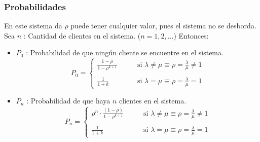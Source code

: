 \documentclass{templateNote}
\begin{document}
\subsubsection{Probabilidades}
En este sistema da $\rho$ puede tener cualquier valor, pues el sistema no se desborda. \newline
Sea $n$ : Cantidad de clientes en el sistema. ($n=1,2,...$)
Entonces:
\begin{itemize}
    \item $P_0$ : Probabilidad de que ning\'un cliente se encuentre en el sistema.
    \begin{equation*}
        P_0 = \begin{cases}
            \displaystyle \frac{1 - \rho}{1 - \rho^{k + 1}} & \qquad \text{si } \lambda \neq \mu \equiv \rho = \frac{\lambda}{\mu} \neq 1 \\
            \\
            \displaystyle \frac{1}{1 + k} & \qquad \text{si } \lambda = \mu \equiv \rho = \frac{\lambda}{\mu} = 1
        \end{cases}
    \end{equation*}
    
    \item $P_n$ : Probabilidad de que haya $n$ clientes en el sistema.
    \begin{equation*}
        P_n = \begin{cases}
            \displaystyle \rho^n \cdot \frac{(1 - \rho)}{1 - \rho^{k + 1}} & \qquad \text{si } \lambda \neq \mu \equiv \rho = \frac{\lambda}{\mu} \neq 1 \\
            \\
            \displaystyle \frac{1}{1 + k} & \qquad \text{si } \lambda = \mu \equiv \rho = \frac{\lambda}{\mu} = 1
        \end{cases}
    \end{equation*}
\end{itemize}

\newpage
\end{document}
